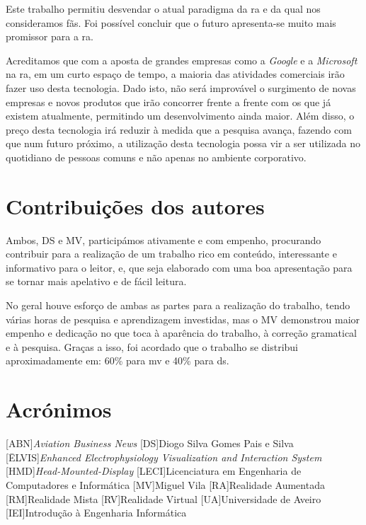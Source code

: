 \documentclass{report}
\begin{document}
Este trabalho permitiu desvendar o atual paradigma da \ac{ra} e da qual nos consideramos fãs. Foi possível concluir que o futuro apresenta-se muito mais promissor para a \ac{ra}.

Acreditamos que com a aposta de grandes empresas como a \textit{Google} e a \textit{Microsoft} na \ac{ra}, em um curto espaço de tempo, a maioria das atividades comerciais irão fazer uso desta tecnologia. Dado isto, não será improvável o surgimento de novas empresas e novos produtos que irão concorrer frente a frente com os que já existem atualmente, permitindo um desenvolvimento ainda maior. Além disso, o preço desta tecnologia irá reduzir à medida que a pesquisa avança, fazendo com que num futuro próximo, a utilização desta tecnologia possa vir a ser utilizada no quotidiano de pessoas comuns e não apenas no ambiente corporativo.

\chapter*{Contribuições dos autores}
Ambos, DS e MV, participámos ativamente e com empenho, procurando contribuir para a realização de um trabalho rico em conteúdo, interessante e informativo para o leitor, e, que seja elaborado com uma boa apresentação para se tornar mais apelativo e de fácil leitura.

No geral houve esforço de ambas as partes para a realização do trabalho, tendo várias horas de pesquisa e aprendizagem investidas, mas o MV demonstrou maior empenho e dedicação no que toca à aparência do trabalho, à correção gramatical e à pesquisa. Graças a isso, foi acordado que o trabalho se distribui aproximadamente em: 60\% para \ac{mv} e 40\% para \ac{ds}.

\chapter*{Acrónimos}
\begin{acronym}
[ABN]{\textit{Aviation Business News}}
[DS]{Diogo Silva Gomes Pais e Silva}
[ĒLVIS]{\textit{Enhanced Electrophysiology Visualization and Interaction System}}
[HMD]{\textit{Head-Mounted-Display}}
[LECI]{Licenciatura em Engenharia de Computadores e Informática}
[MV]{Miguel Vila}
[RA]{Realidade Aumentada}
[RM]{Realidade Mista}
[RV]{Realidade Virtual}
[UA]{Universidade de Aveiro}
[IEI]{Introdução à Engenharia Informática}
\end{acronym}

\printbibliography
\end{document}

